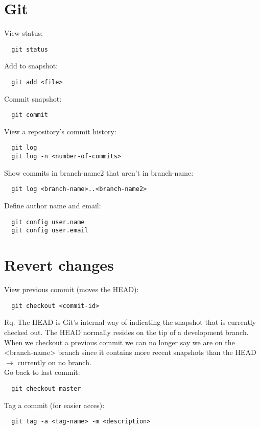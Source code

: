 \documentclass[french]{article}
\begin{document}
\section{Git}


View status:
\begin{verbatim}
  git status
\end{verbatim}

Add to snapshot:
\begin{verbatim}
  git add <file>
\end{verbatim}

Commit snapshot:
\begin{verbatim}
  git commit
\end{verbatim}

View a repository's commit history:
\begin{verbatim}
  git log
  git log -n <number-of-commits>
\end{verbatim}

Show commits in branch-name2 that aren't in branch-name:
\begin{verbatim}
  git log <branch-name>..<branch-name2>
\end{verbatim}

Define author name and email:
\begin{verbatim}
  git config user.name
  git config user.email
\end{verbatim}

\section{Revert changes}

View previous commit (moves the HEAD):
\begin{verbatim}
  git checkout <commit-id>
\end{verbatim}
Rq. The HEAD is Git's internal way of indicating the snapshot that is currently checked out. The HEAD normally resides on the tip of a development branch. When we checkout a previous commit we can no longer say we are on the <branch-name> branch since it contains more recent snapshots than the HEAD $\rightarrow$ currently on no branch.\\

Go back to last commit:
\begin{verbatim}
  git checkout master
\end{verbatim}

Tag a commit (for easier acces):
\begin{verbatim}
  git tag -a <tag-name> -m <description>
\end{verbatim}
\end{document}
